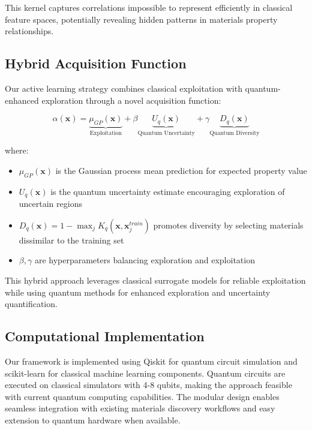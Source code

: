 \documentclass[twocolumn]{article}
\begin{document}
This kernel captures correlations impossible to represent efficiently in classical feature spaces, potentially revealing hidden patterns in materials property relationships.

\subsection{Hybrid Acquisition Function}

Our active learning strategy combines classical exploitation with quantum-enhanced exploration through a novel acquisition function:

\begin{equation}
\alpha(\mathbf{x}) = \underbrace{\mu_{GP}(\mathbf{x})}_{\text{Exploitation}} + \beta \underbrace{U_q(\mathbf{x})}_{\text{Quantum Uncertainty}} + \gamma \underbrace{D_q(\mathbf{x})}_{\text{Quantum Diversity}}
\end{equation}

where:
\begin{itemize}
\item $\mu_{GP}(\mathbf{x})$ is the Gaussian process mean prediction for expected property value
\item $U_q(\mathbf{x})$ is the quantum uncertainty estimate encouraging exploration of uncertain regions
\item $D_q(\mathbf{x}) = 1 - \max_j K_q(\mathbf{x}, \mathbf{x}_j^{train})$ promotes diversity by selecting materials dissimilar to the training set
\item $\beta, \gamma$ are hyperparameters balancing exploration and exploitation
\end{itemize}

This hybrid approach leverages classical surrogate models for reliable exploitation while using quantum methods for enhanced exploration and uncertainty quantification.

\subsection{Computational Implementation}

Our framework is implemented using Qiskit for quantum circuit simulation and scikit-learn for classical machine learning components. Quantum circuits are executed on classical simulators with 4-8 qubits, making the approach feasible with current quantum computing capabilities. The modular design enables seamless integration with existing materials discovery workflows and easy extension to quantum hardware when available.
\end{document}
